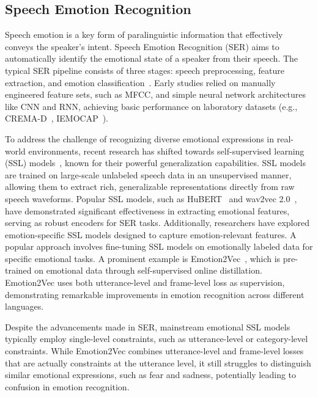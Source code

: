 \subsection{Speech Emotion Recognition}

Speech emotion is a key form of paralinguistic information that effectively conveys the speaker’s intent. Speech Emotion Recognition (SER) aims to automatically identify the emotional state of a speaker from their speech. The typical SER pipeline consists of three stages: speech preprocessing, feature extraction, and emotion classification~\cite{review-mer1}. Early studies relied on manually engineered feature sets, such as MFCC, and simple neural network architectures like CNN and RNN, achieving basic performance on laboratory datasets (e.g., CREMA-D~\cite{CREMA-D}, IEMOCAP~\cite{IEMOCAP}).

To address the challenge of recognizing diverse emotional expressions in real-world environments, recent research has shifted towards self-supervised learning (SSL) models~\cite{ssl_ser,ssl_ser2}, known for their powerful generalization capabilities. SSL models are trained on large-scale unlabeled speech data in an unsupervised manner, allowing them to extract rich, generalizable representations directly from raw speech waveforms. Popular SSL models, such as HuBERT~\cite{Hubert} and wav2vec 2.0~\cite{wav2vec2.0}, have demonstrated significant effectiveness in extracting emotional features, serving as robust encoders for SER tasks. Additionally, researchers have explored emotion-specific SSL models designed to capture emotion-relevant features. A popular approach involves fine-tuning SSL models on emotionally labeled data for specific emotional tasks. A prominent example is Emotion2Vec~\cite{Emotion2Vec}, which is pre-trained on emotional data through self-supervised online distillation. Emotion2Vec uses both utterance-level and frame-level loss as supervision, demonstrating remarkable improvements in emotion recognition across different languages.

Despite the advancements made in SER, mainstream emotional SSL models typically employ single-level constraints, such as utterance-level or category-level constraints. While Emotion2Vec combines utterance-level and frame-level losses that are actually constraints at the utterance level, it still struggles to distinguish similar emotional expressions, such as fear and sadness, potentially leading to confusion in emotion recognition.